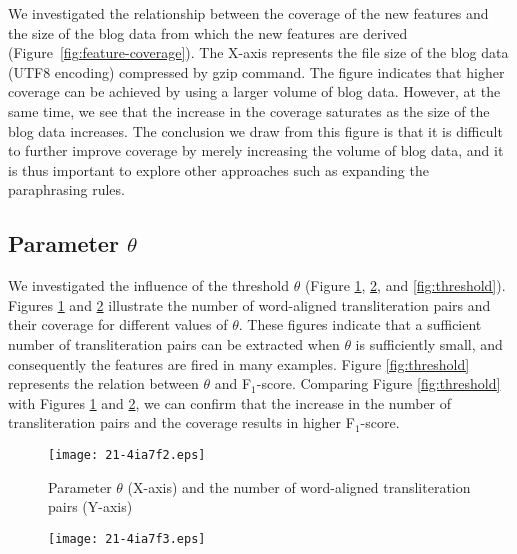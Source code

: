 \documentclass[english]{jnlp_1.4_rep}
\begin{document}
We investigated the relationship between the coverage of the new
features and the size of the blog data from which the new features are
derived (Figure~\ref{fig:feature-coverage}). The X-axis represents the
file size of the blog data (UTF8 encoding) compressed by gzip
command. The figure indicates that higher coverage can be achieved by
using a larger volume of blog data. However, at the same time, we see
that the increase in the coverage saturates as the size of the blog data
increases. The conclusion we draw from this figure is that it is
difficult to further improve coverage by merely increasing the volume of
blog data, and it is thus important to explore other approaches such as
expanding the paraphrasing rules.



\subsection{Parameter $\theta$}
\label{sec:threshold}

We investigated the influence of the threshold $\theta$ (Figure
\ref{fig:size}, \ref{fig:coverage}, and \ref{fig:threshold}). Figures
\ref{fig:size} and \ref{fig:coverage} illustrate the number of
word-aligned transliteration pairs and their coverage for different
values of $\theta$. These figures indicate that a sufficient number of
transliteration pairs can be extracted when $\theta$ is sufficiently
small, and consequently the features are fired in many examples. Figure
\ref{fig:threshold} represents the relation between $\theta$ and
F$_{1}$-score. Comparing Figure \ref{fig:threshold} with Figures
\ref{fig:size} and \ref{fig:coverage}, we can confirm that the increase
in the number of transliteration pairs and the coverage results in
higher F$_1$-score.

\begin{figure}[b]
 \begin{center}
\texttt{[image: 21-4ia7f2.eps]}
 \end{center}
  \caption{Parameter $\theta$ (X-axis) and the number of word-aligned
  transliteration pairs (Y-axis)}
  \label{fig:size}
\end{figure}
\begin{figure}[b]
 \begin{center}
\texttt{[image: 21-4ia7f3.eps]}
 \end{center}
  \label{fig:coverage}
\end{figure}
\end{document}
